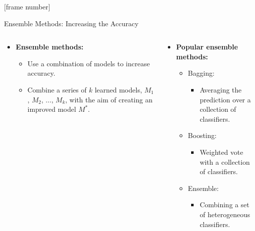 \documentclass[aspectratio=169,t,table]{beamer}
\begin{document}
  {
    [frame number]
    \begin{frame}{Ensemble Methods: Increasing the Accuracy}
      \begin{columns}
        \begin{column}{0.4\textwidth}
          \centering
          \begin{itemize}
            \item \textbf{{\color{airforceblue}Ensemble} methods:}
            \begin{itemize}
              \item Use a combination of models to increase accuracy.
              \item Combine a series of $k$ learned models, $M_1$, $M_2$, $\ldots$, $M_k$, with the aim of creating an improved model $M^*$.
            \end{itemize}
          \end{itemize}
        \end{column}
        \begin{column}{0.5\textwidth}
          \centering
          \begin{itemize}
            \item \textbf{Popular ensemble methods:}
            \begin{itemize}
              \item Bagging:
              \begin{itemize}
                \item Averaging the prediction over a collection of classifiers.
              \end{itemize}
              \item Boosting:
              \begin{itemize}
                \item Weighted vote with a collection of classifiers.
              \end{itemize}
              \item Ensemble:
              \begin{itemize}
                \item Combining a set of heterogeneous classifiers.
              \end{itemize}
            \end{itemize}
          \end{itemize}
        \end{column}
      \end{columns}
    \end{frame}
  }
\end{document}
